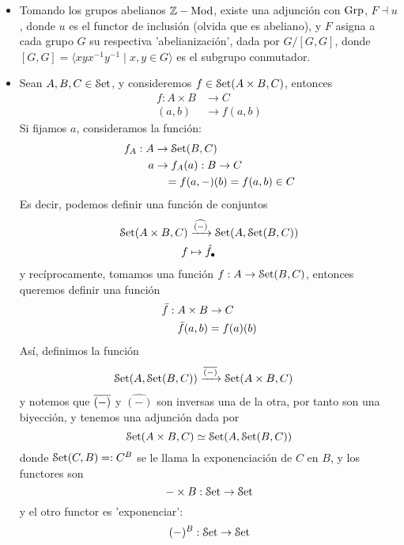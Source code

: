 \begin{example}
\begin{itemize}
    \item
    Tomando los grupos abelianos $\mathbb Z-\mathrm{Mod}$, existe una adjunción con $\mathrm{Grp}$, $F\dashv u$, donde $u$ es el functor de inclusión (olvida que es abeliano), y $F$ asigna a cada grupo $G$ su respectiva 'abelianización', dada por $G/[G,G]$,
    donde $[G,G]=\langle xyx^{-1}y^{-1}\mid x,y\in G\rangle$
    es el subgrupo conmutador.
    \item Sean $A,B,C\in\mathcal{S}\mathrm{et}$, y consideremos $f\in\mathcal{S}\mathrm{et}(A\times B, C)$, entonces
    \begin{align*}
        f: A\times B & \to C \\
        (a,b) & \to f(a,b)
    \end{align*}
    Si fijamos $a$, consideramos la función:
    \begin{align*}
        f_A: A & \to \mathcal{S}\mathrm{et}(B,C)\\
        a & \to f_A(a): B\to C \\
        &\quad = f(a,-)(b)=f(a,b)\in C
    \end{align*}
    Es decir, podemos definir una función de conjuntos
    \begin{align*}
        \mathcal{S}\mathrm{et}(A\times B, C) & \xrightarrow{\widehat{(-)}} \mathcal{S}\mathrm{et}(A,\mathcal{S}\mathrm{et}(B,C)) \\
        f&\mapsto \hat{f_{\bullet}}
    \end{align*}
    y recíprocamente, tomamos una función $f:A\to\mathcal{S}\mathrm{et}(B,C)$, entonces queremos definir una función
    \begin{align*}
        \Bar{f}:A\times B & \to C \\
        \Bar{f}(a,b) &= f(a)(b)
    \end{align*}
    Así, definimos la función 
    \begin{align*}
        \mathcal{S}\mathrm{et}(A,\mathcal{S}\mathrm{et}(B,C))
        & \xrightarrow{\overline{(-)}}
        \mathcal{S}\mathrm{et}(A\times B, C)
    \end{align*}
    y notemos que $\overline{(-)}$ y $\widehat{(-)}$ son inversas una de la otra, por tanto son una biyección, y tenemos una adjunción dada por
    \begin{equation*}
        \mathcal{S}\mathrm{et}(A\times B, C)\simeq\mathcal{S}\mathrm{et}(A,\mathcal{S}\mathrm{et}(B,C))
    \end{equation*}
    donde $\mathcal{S}\mathrm{et}(C,B)=:C^B$ se le llama la exponenciación de $C$ en $B$, y los functores son
    \begin{equation*}
        {-}\times B:\mathcal{S}\mathrm{et}\to \mathcal{S}\mathrm{et}
    \end{equation*}
    y el otro functor es 'exponenciar':
    \begin{equation*}
        ({-})^B:\mathcal{S}\mathrm{et}\to \mathcal{S}\mathrm{et}
    \end{equation*}
\end{itemize}
\end{example}
    
